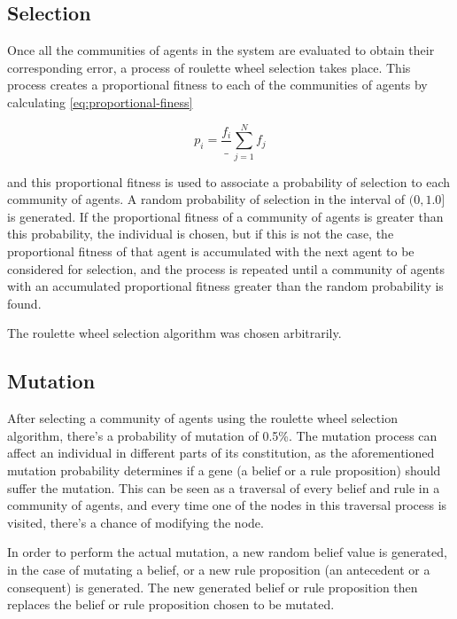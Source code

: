 \subsection{Selection}
\label{subsection:selection}

Once all the communities of agents in the system are evaluated to obtain their
corresponding error, a process of roulette wheel selection takes place. This
process creates a proportional fitness to each of the communities of agents by
calculating \ref{eq:proportional-finess}

\begin{equation}
  \label{eq:proportional-fitness}
  p_i = \frac{f_i}_{\sum_{j=1}^{N} f_j}
\end{equation}

and this proportional fitness is used to associate a probability of selection to
each community of agents. A random probability of selection in the interval of
$(0, 1.0]$ is generated. If the proportional fitness of a community of agents is
greater than this probability, the individual is chosen, but if this is not the
case, the proportional fitness of that agent is accumulated with the next agent
to be considered for selection, and the process is repeated until a community of
agents with an accumulated proportional fitness greater than the random
probability is found.

The roulette wheel selection algorithm was chosen arbitrarily.

\subsection{Mutation}
\label{subsection:mutation}

After selecting a community of agents using the roulette wheel selection
algorithm, there's a probability of mutation of 0.5\%. The mutation process can
affect an individual in different parts of its constitution, as the
aforementioned mutation probability determines if a gene (a belief or a rule
proposition) should suffer the mutation. This can be seen as a traversal of
every belief and rule in a community of agents, and every time one of the nodes
in this traversal process is visited, there's a chance of modifying the node.

In order to perform the actual mutation, a new random belief value is generated,
in the case of mutating a belief, or a new rule proposition (an antecedent or a
consequent) is generated. The new generated belief or rule proposition then
replaces the belief or rule proposition chosen to be mutated.

